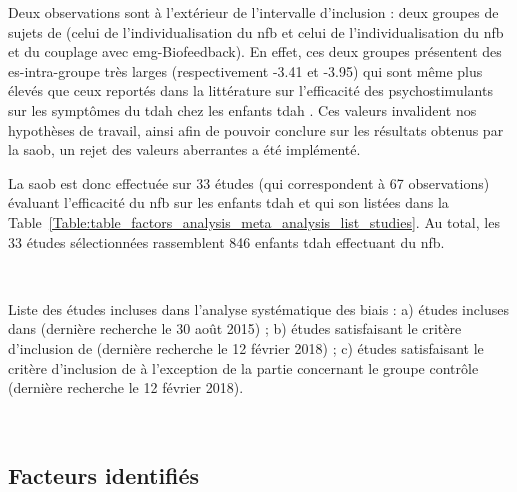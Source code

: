 Deux observations sont à l'extérieur de l'intervalle d'inclusion : deux groupes de sujets de \citet{Bazanova2018} (celui de l'individualisation du \gls{nfb} et celui de
l'individualisation du \gls{nfb} et du couplage avec \gls{emg}-Biofeedback). En effet, ces deux groupes présentent des \gls{es}-intra-groupe très larges (respectivement -3.41 et -3.95)
qui sont même plus élevés que ceux reportés dans la littérature sur l'efficacité des psychostimulants sur les symptômes du \gls{tdah} chez les enfants \gls{tdah} \citep{Luan2017}.
Ces valeurs invalident nos hypothèses de travail, ainsi afin de pouvoir conclure sur les résultats obtenus par la \gls{saob}, un rejet des valeurs aberrantes a été implémenté.

La \gls{saob} est donc effectuée sur 33 études (qui correspondent à 67 observations) évaluant l'efficacité du \gls{nfb} sur les enfants \gls{tdah} et qui son listées dans la 
Table~\ref{Table:table_factors_analysis_meta_analysis_list_studies}. Au total, les 33 études sélectionnées rassemblent 846 enfants \gls{tdah} effectuant du \gls{nfb}.

\newpage\
\begin{table}[h!]
  \centering
  \caption{Liste des études incluses dans l'analyse systématique des biais : a) études incluses dans \citet{Cortese2016}
	(dernière recherche le 30 août 2015) ; b) études satisfaisant le critère d'inclusion de \citet{Cortese2016} (dernière recherche le 12 février 2018) ; c) études 
	satisfaisant le critère d'inclusion de \citet{Cortese2016} à l'exception de la partie concernant le groupe contrôle (dernière recherche le 12 février 2018).}
  
  \label{Table:table_factors_analysis_meta_analysis_list_studies}
\end{table}

\newpage\
\subsection{Facteurs identifiés}

